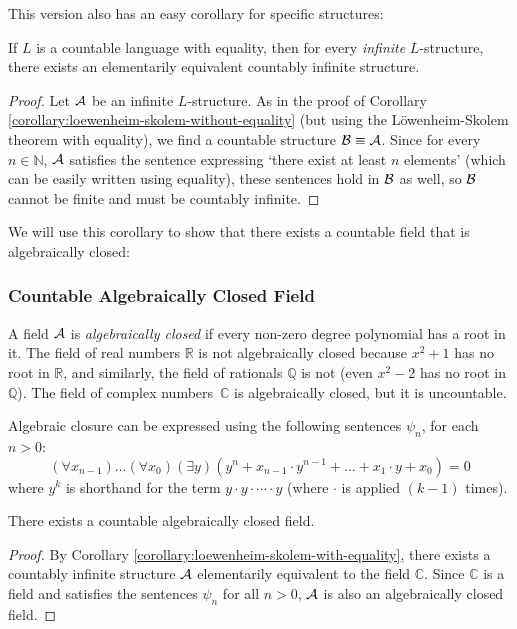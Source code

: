 This version also has an easy corollary for specific structures:

\begin{corollary}\label{corollary:loewenheim-skolem-with-equality}
    If $L$ is a countable language with equality, then for every \emph{infinite} $L$-structure, there exists an elementarily equivalent countably infinite structure.
\end{corollary}
\begin{proof}
    Let $\mathcal{A}$ be an infinite $L$-structure. As in the proof of Corollary \ref{corollary:loewenheim-skolem-without-equality} (but using the Löwenheim-Skolem theorem with equality), we find a countable structure $\mathcal{B}\equiv\mathcal{A}$. Since for every $n\in\mathbb{N}$, $\mathcal{A}$ satisfies the sentence expressing `there exist at least $n$ elements' (which can be easily written using equality), these sentences hold in $\mathcal{B}$ as well, so $\mathcal{B}$ cannot be finite and must be countably infinite.
\end{proof}

We will use this corollary to show that there exists a countable field that is algebraically closed:

\subsubsection*{Countable Algebraically Closed Field}

A field $\mathcal{A}$ is \emph{algebraically closed} if every non-zero degree polynomial has a root in it. The field of real numbers $\mathbb{R}$ is not algebraically closed because $x^2+1$ has no root in $\mathbb{R}$, and similarly, the field of rationals $\mathbb{Q}$ is not (even $x^2-2$ has no root in $\mathbb{Q}$). The field of complex numbers~$\mathbb{C}$ is algebraically closed, but it is uncountable.

Algebraic closure can be expressed using the following sentences $\psi_n$, for each $n>0$:
$$
(\forall x_{n-1})\dots(\forall x_0)(\exists y)(y^n+x_{n-1}\cdot y^{n-1}+\dots+x_1\cdot y + x_0) = 0
$$
where $y^k$ is shorthand for the term $y \cdot y \cdot \cdots \cdot y$ (where $\cdot$ is applied $(k-1)$ times).

\begin{corollary}
    There exists a countable algebraically closed field.
\end{corollary}
\begin{proof}
    By Corollary \ref{corollary:loewenheim-skolem-with-equality}, there exists a countably infinite structure $\mathcal{A}$ elementarily equivalent to the field $\mathbb{C}$. Since $\mathbb{C}$ is a field and satisfies the sentences $\psi_n$ for all $n>0$, $\mathcal{A}$ is also an algebraically closed field.
\end{proof}

